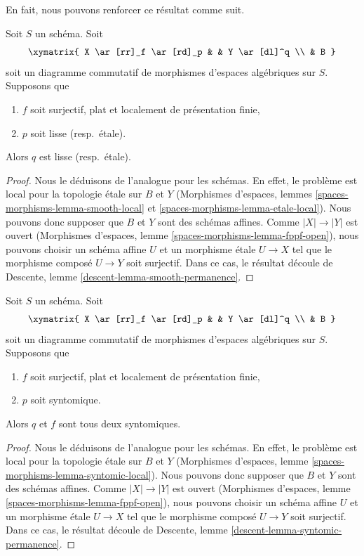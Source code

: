 \noindent
En fait, nous pouvons renforcer ce résultat comme suit.

\begin{lemma}
\label{lemma-smooth-permanence}
Soit $S$ un schéma. Soit
$$
\xymatrix{
X \ar[rr]_f \ar[rd]_p & &
Y \ar[dl]^q \\
& B
}
$$
soit un diagramme commutatif de morphismes d'espaces algébriques sur $S$. Supposons que
\begin{enumerate}
\item $f$ soit surjectif, plat et localement de présentation finie,
\item $p$ soit lisse (resp.\ \'etale).
\end{enumerate}
Alors $q$ est lisse (resp.\ \'etale).
\end{lemma}

\begin{proof}
Nous le déduisons de l'analogue pour les schémas.
En effet, le problème est local pour la topologie \'etale sur $B$ et $Y$
(Morphismes d'espaces, lemmes
\ref{spaces-morphisms-lemma-smooth-local} et
\ref{spaces-morphisms-lemma-etale-local}).
Nous pouvons donc supposer que $B$ et $Y$ sont des
schémas affines. Comme $|X| \to |Y|$ est ouvert
(Morphismes d'espaces, lemme \ref{spaces-morphisms-lemma-fppf-open}),
nous pouvons choisir un
schéma affine $U$ et un morphisme \'etale $U \to X$ tel que le
morphisme composé $U \to Y$ soit surjectif. Dans ce cas, le résultat
découle de Descente, lemme
\ref{descent-lemma-smooth-permanence}.
\end{proof}

\begin{lemma}
\label{lemma-syntomic-permanence}
Soit $S$ un schéma. Soit
$$
\xymatrix{
X \ar[rr]_f \ar[rd]_p & &
Y \ar[dl]^q \\
& B
}
$$
soit un diagramme commutatif de morphismes d'espaces algébriques sur $S$. Supposons que
\begin{enumerate}
\item $f$ soit surjectif, plat et localement de présentation finie,
\item $p$ soit syntomique.
\end{enumerate}
Alors $q$ et $f$ sont tous deux syntomiques.
\end{lemma}

\begin{proof}
Nous le déduisons de l'analogue pour les schémas.
En effet, le problème est local pour la topologie \'etale sur $B$ et $Y$
(Morphismes d'espaces, lemme
\ref{spaces-morphisms-lemma-syntomic-local}).
Nous pouvons donc supposer que $B$ et $Y$ sont des
schémas affines. Comme $|X| \to |Y|$ est ouvert
(Morphismes d'espaces, lemme \ref{spaces-morphisms-lemma-fppf-open}),
nous pouvons choisir un
schéma affine $U$ et un morphisme \'etale $U \to X$ tel que le
morphisme composé $U \to Y$ soit surjectif. Dans ce cas, le résultat
découle de Descente, lemme
\ref{descent-lemma-syntomic-permanence}.
\end{proof}










